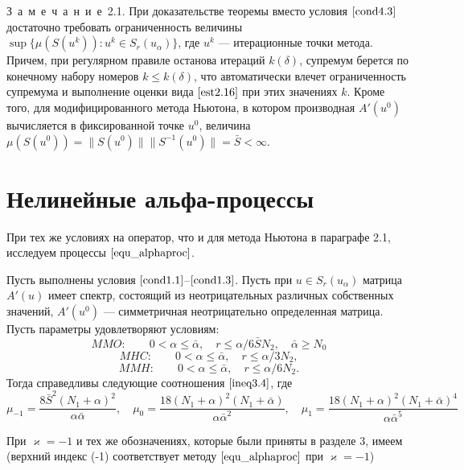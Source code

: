 \mbox{З\ а\ м\ е\ ч\ а\ н\ и\ е 2.1.} При доказательстве теоремы вместо условия  $\eqref{cond4.3}$ достаточно требовать ограниченность величины $\sup\{\mu(S(u^k)): u^k \in S_r(u_\alpha)\}$, где $u^k$ --- итерационные точки метода. Причем, при регулярном правиле останова итераций $k(\delta)$, супремум берется по конечному набору номеров $k\le k(\delta)$, что автоматически влечет ограниченность супремума и выполнение оценки вида $\eqref{est2.16}$ при этих значениях $k$. Кроме того, для модифицированного метода Ньютона, в котором производная $A'(u^0)$ вычисляется в фиксированной точке $u^0$, величина $\mu(S(u^0))=\|S(u^0)\|\|S^{-1}(u^0)\|=\bar S<\infty$.

\newpage
\section{Нелинейные альфа-процессы}
При тех же условиях на оператор, что и для метода Ньютона в параграфе 2.1, исследуем процессы $\eqref{equ_alphaproc}$.
\begin{theorem}\label{teo4.2}
	Пусть выполнены условия $\eqref{cond1.1}$--$\eqref{cond1.3}$. Пусть при $u \in S_r(u_\alpha)$ матрица $A'(u)$ имеет спектр, состоящий из неотрицательных различных собственных значений, $A'(u^0)$ --- симметричная неотрицательно определенная матрица. Пусть параметры удовлетворяют условиям: 
	\begin{equation}\label{cond4.4}
	MMO:\qquad 0<\alpha\le\bar\alpha, \quad r\le\alpha /6\bar SN_2, \quad \bar\alpha \ge N_0
	\end{equation}
	\begin{equation}\label{cond4.5}
	MHC:\qquad 0<\alpha\le\bar\alpha, \quad r\le\alpha /3N_2,
	\end{equation}
	\begin{equation}\label{cond4.6}
	MMH:\qquad 0<\alpha\le\bar\alpha, \quad r\le\alpha /6N_2.
	\end{equation}
	Тогда справедливы следующие соотношения  $\eqref{ineq3.4}$, где
	\begin{equation}\label{eq4.7}
	\mu _{-1}=\frac{8\bar S^2(N_1+\alpha)^2}{\alpha\bar\alpha}, \quad \mu _0=\frac{18(N_1+\alpha)^2(N_1+\bar\alpha)}{\alpha\bar\alpha ^2}, \quad \mu _1=\frac{18(N_1+\alpha)^2(N_1+\bar\alpha)^4}{\alpha\bar\alpha ^5}
	\end{equation}
\end{theorem}
\proof При $\varkappa=-1$ и тех же обозначениях, которые были приняты в разделе 3, имеем (верхний индекс (-1) соответствует методу $\eqref{equ_alphaproc}$ при $\varkappa=-1$)
